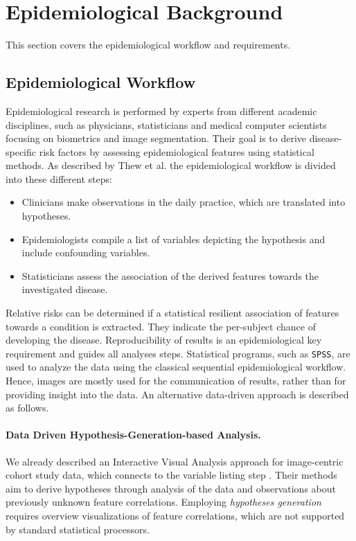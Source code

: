 \documentclass[journal]{style/vgtc} 			          %
\begin{document}
\section{Epidemiological Background} \label{sec:Background}
This section covers the epidemiological workflow and requirements.
\subsection{Epidemiological Workflow} \label{EpidemiologicalWorkflow}
Epidemiological research is performed by experts from different academic disciplines, such as physicians, statisticians and medical computer scientists focusing on biometrics and image segmentation.
Their goal is to derive disease-specific risk factors by assessing epidemiological features using statistical methods.
As described by Thew et al. \cite{Thew2009} the epidemiological workflow is divided into these different steps:
\begin{itemize}
	\item Clinicians make observations in the daily practice, which are translated into hypotheses.
	\item Epidemiologists compile a list of variables depicting the hypothesis and include confounding variables.
	\item Statisticians assess the association of the derived features towards the investigated disease.
\end{itemize}
Relative risks can be determined if a statistical resilient association of features towards a condition is extracted.
They indicate the per-subject chance of developing the disease.
Reproducibility of results is an epidemiological key requirement and guides all analyses steps.
Statistical programs, such as \texttt{SPSS}, are used to analyze the data using the classical sequential epidemiological workflow. Hence, images are mostly used for the communication of results, rather than for providing insight into the data.
An alternative data-driven approach is described as follows.

\paragraph{Data Driven Hypothesis-Generation-based Analysis.}
We already described an Interactive Visual Analysis approach for image-centric cohort study data, which connects to the variable listing step \cite{Klemm2014VIS}.
Their methods aim to derive hypotheses through analysis of the data and observations about previously unknown feature correlations.
Employing \emph{hypotheses generation} requires overview visualizations of feature correlations, which are not supported by standard statistical processors.
\end{document}

